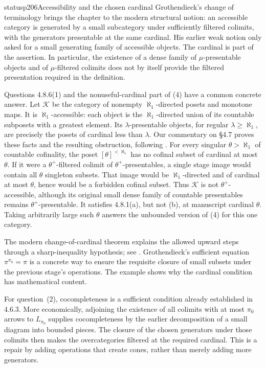 \begin{dcomment}{status}{p206}{Accessibility and the chosen cardinal}
Grothendieck's change of terminology brings the chapter to the modern structural notion: an accessible category is generated by a small subcategory under sufficiently filtered colimits, with the generators presentable at the same cardinal. His earlier weak notion only asked for a small generating family of accessible objects. The cardinal is part of the assertion. In particular, the existence of a dense family of $\mu$-presentable objects and of $\mu$-filtered colimits does not by itself provide the filtered presentation required in the definition.

Questions 4.8.6(1) and the nonuseful-cardinal part of (4) have a common concrete answer. Let $\mathcal K$ be the category of nonempty $\aleph_1$-directed posets and monotone maps. It is $\aleph_1$-accessible: each object is the $\aleph_1$-directed union of its countable subposets with a greatest element. Its $\lambda$-presentable objects, for regular $\lambda\geq\aleph_1$, are precisely the posets of cardinal less than $\lambda$. Our commentary on \S4.7 proves these facts and the resulting obstruction, following \citet[Example~3.8]{Vasey2020Accessible}. For every singular $\theta>\aleph_1$ of countable cofinality, the poset $[\theta]^{<\aleph_1}$ has no cofinal subset of cardinal at most $\theta$. If it were a $\theta^+$-filtered colimit of $\theta^+$-presentables, a single stage image would contain all $\theta$ singleton subsets. That image would be $\aleph_1$-directed and of cardinal at most $\theta$, hence would be a forbidden cofinal subset. Thus $\mathcal K$ is not $\theta^+$-accessible, although its original small dense family of countable presentables remains $\theta^+$-presentable. It satisfies 4.8.1(a), but not (b), at manuscript cardinal $\theta$. Taking arbitrarily large such $\theta$ answers the unbounded version of (4) for this one category.

The modern change-of-cardinal theorem explains the allowed upward steps through a sharp-inequality hypothesis; see \citet[Proposition~5.4.2.9 and Remark~5.4.2.10]{Lurie2009HTT}. Grothendieck's sufficient equation $\pi^{\pi_0}=\pi$ is a concrete way to ensure the requisite closure of small subsets under the previous stage's operations. The example shows why the cardinal condition has mathematical content.

For question~(2), cocompleteness is a sufficient condition already established in 4.6.3. More economically, adjoining the existence of all colimits with at most $\pi_0$ arrows to $L_{\pi_0}$ supplies cocompleteness by the earlier decomposition of a small diagram into bounded pieces. The closure of the chosen generators under those colimits then makes the overcategories filtered at the required cardinal. This is a repair by adding operations that create cones, rather than merely adding more generators.


\end{dcomment}
